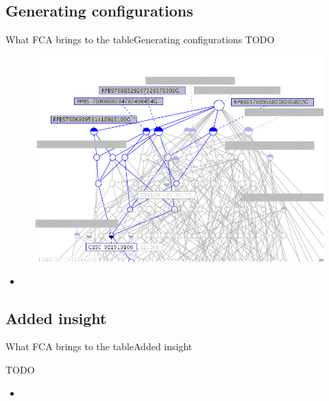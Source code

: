 \subsection{Generating configurations}
\begin{frame}{What FCA brings to the table}{Generating configurations}
TODO
\begin{minipage}[t]{0.40\linewidth}
  \begin{figure}[ht]
    \centering
    \includegraphics[width=\textwidth]{img/fca/common_part}
  \end{figure}
\end{minipage}
\begin{minipage}{0.60\linewidth}
  \begin{itemize}
    \item 
  \end{itemize}
\end{minipage}

\end{frame}


\subsection{Added insight}
\begin{frame}{What FCA brings to the table}{Added insight}

TODO
\begin{minipage}[t]{0.40\linewidth}
  \begin{figure}[ht]
    \centering
  \end{figure}
\end{minipage}
\begin{minipage}{0.60\linewidth}
  \begin{itemize}
    \item 
  \end{itemize}
\end{minipage}

\end{frame}